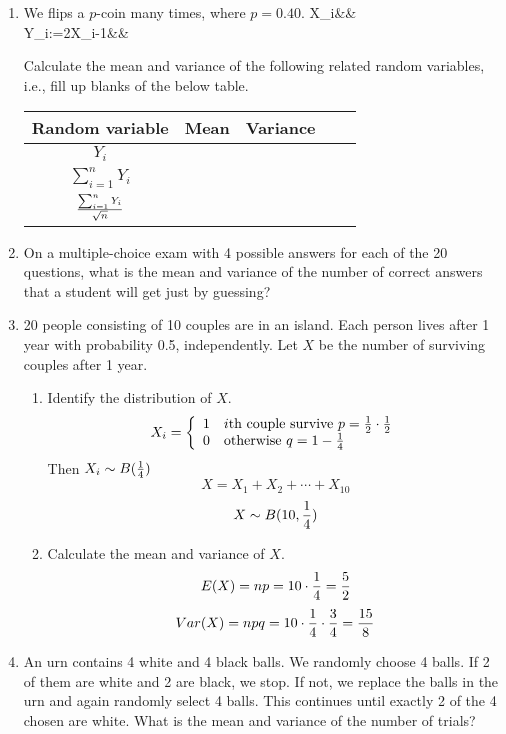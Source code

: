 \documentclass[12pt]{article}%
\newcommand{\0}{{\bf 0}}
\begin{document}
\begin{enumerate}
\item
We flips a $p$-coin many times, where $p=0.40$.
\bea
X_i&&\nn\\
Y_i:=2X_i-1&&\nn
\eea

Calculate the mean and variance of the following related random variables,
i.e., fill up blanks of the below table.
\begin{table}[H]    \center
\begin{tabular}{|c||c|c|c||c|} \hline
Random variable&Mean&Variance\\\hline\hline  
$Y_i$&&\\\hline
$\sum_{i=1}^nY_i$&&\\\hline
$\f{\sum_{i=1}^nY_i}{\sqrt{n}}$&&\\\hline
\end{tabular}
\end{table}




\item
On a multiple-choice exam with 4 possible answers for each of the 20 questions, 
what is the mean and variance of the number of correct answers 
that a student will get just by guessing?



\item
20 people consisting of 10 couples are in an island.
Each person lives after 1 year with probability 0.5, independently.
Let $X$ be the number of surviving couples after 1 year. 
\begin{enumerate}
\item
Identify the distribution of $X$. 
\\
{\color{blue}{\bf Sol.}}
$$
X_i=\left\{\ba{ll}
1 &i\mb{th couple survive}\ p=\f{1}{2}\cdot\f{1}{2} \\
0 &\mb{otherwise}\ q=1-\f{1}{4}\
\ea\right.
$$
Then $X_i \sim B(\f{1}{4})$
$$X=X_1+X_2+\cdots+X_{10}$$
$$X\sim B(10,\f{1}{4})$$
\item
Calculate the mean and variance of $X$. 
\\
{\color{blue}{\bf Sol.}}
$$E(X)=np=10\cdot\f{1}{4}=\f{5}{2}$$
$$Var(X)=npq=10\cdot\f{1}{4}\cdot\f{3}{4}=\f{15}{8}$$
\end{enumerate}



\item
An urn contains 4 white and 4 black balls. 
We randomly choose 4 balls. 
If 2 of them are white and 2 are black, we stop. 
If not, we replace the balls in the urn and again randomly select 4 balls. 
This continues until exactly 2 of the 4 chosen are white. 
What is the mean and variance of the number of trials?






\end{enumerate}
\end{document}
